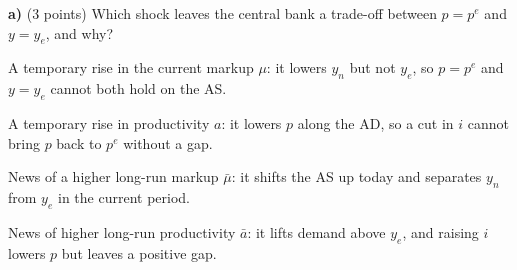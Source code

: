 

\textbf{a)} (3 points) Which shock leaves the central bank a trade-off between $p=p^e$ and $y=y_e$, and why?
\begin{alternativas}
\item A temporary rise in the current markup $\mu$: it lowers $y_n$ but not $y_e$, so $p=p^e$ and $y=y_e$ cannot both hold on the AS.
\item A temporary rise in productivity $a$: it lowers $p$ along the AD, so a cut in $i$ cannot bring $p$ back to $p^e$ without a gap.
\item News of a higher long-run markup $\bar\mu$: it shifts the AS up today and separates $y_n$ from $y_e$ in the current period.
\item News of higher long-run productivity $\bar a$: it lifts demand above $y_e$, and raising $i$ lowers $p$ but leaves a positive gap.
\end{alternativas}
